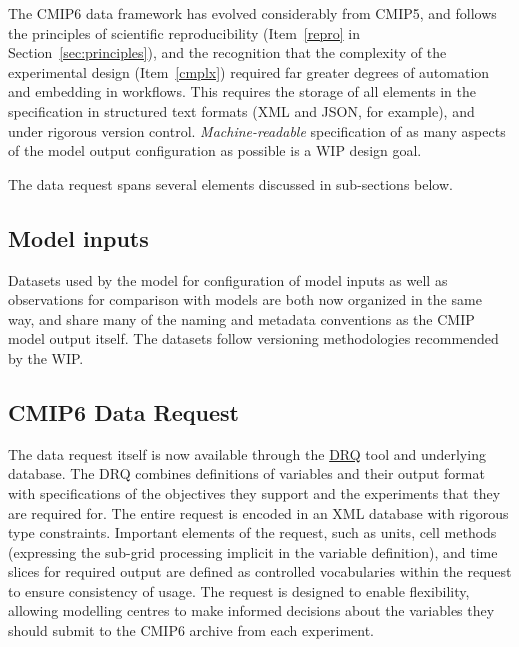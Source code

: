 \documentclass[gmd,manuscript]{copernicus}
\newcommand{\pipref}[1] {\citep{ref:#1}}
\newcommand{\secref}[1] {\mbox{Section  \ref{sec:#1}}}
\begin{document}
The CMIP6 data framework has evolved considerably from CMIP5, and
follows the principles of scientific reproducibility (Item~\ref{repro}
in \secref{principles}), and the recognition that the complexity of
the experimental design (Item~\ref{cmplx}) required far greater
degrees of automation and embedding in workflows. This requires the
storage of all elements in the specification in structured text
formats (XML and JSON, for example), and under rigorous version
control. \emph{Machine-readable} specification of as many aspects of
the model output configuration as possible is a WIP design goal.

The data request spans several elements discussed in sub-sections
below.

\subsection{Model inputs}
\label{sec:data-inputs}

Datasets used by the model for configuration of model inputs
\citep[\texttt{input4MIPs}, see][]{ref:duracketal2017} as well as
observations for comparison with models \citep[\texttt{obs4MIPs},
see][]{ref:teixeiraetal2014} are both now organized in the same way, 
and share many of the naming and metadata conventions as the
CMIP model output itself. The datasets follow versioning
methodologies recommended by the WIP.

\subsection{CMIP6 Data Request}
\label{sec:data-request}

The data request itself \pipref{juckesetal2015} is now available
through the \href{https://goo.gl/iNBQ9m}{DRQ} tool and underlying
database. The DRQ combines definitions of variables and their output
format with specifications of the objectives they support and the
experiments that they are required for. The entire request is encoded
in an XML database with rigorous type constraints. Important elements
of the request, such as units, cell methods (expressing the sub-grid
processing implicit in the variable definition), and time slices for
required output are defined as controlled vocabularies within the
request to ensure consistency of usage. The request is designed to
enable flexibility, allowing modelling centres to make informed
decisions about the variables they should submit to the CMIP6 archive
from each experiment.
\end{document}
